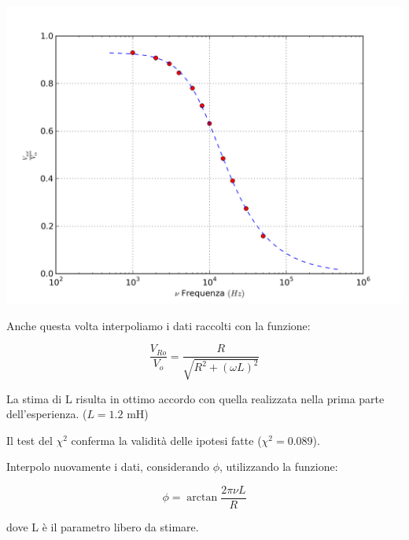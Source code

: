 \begin{center}
 \includegraphics[scale=0.70]{grafici/C3/ddpindu.png}
\end{center}

Anche questa volta interpoliamo i dati raccolti con la funzione:

$$\frac{V_{Ro}}{V_o} = \frac{R}{\sqrt{R^2+(\omega L)^2}}$$

La stima di L risulta in ottimo accordo con quella realizzata nella prima parte dell'esperienza.
($L=1.2$ mH)

Il test del $\chi^2$ conferma la validità delle ipotesi fatte ($\chi^2 = 0.089$).

Interpolo nuovamente i dati, considerando $\phi$, utilizzando la funzione:

$$ \phi = \arctan \frac{2\pi\nu L}{R} $$

dove L è il parametro libero da stimare.

